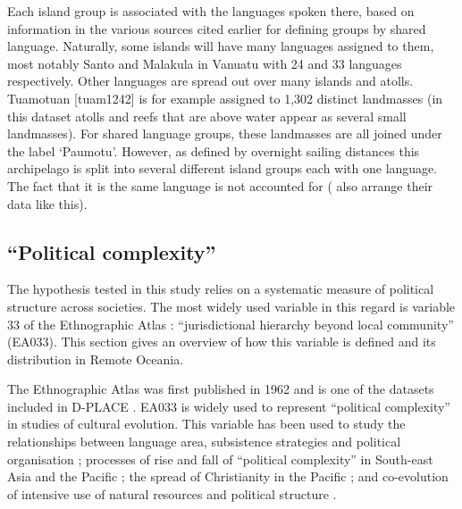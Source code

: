 \documentclass[unnumsec,webpdf,modern,medium]{oup-authoring-template}
\begin{document}
\begin{appendices}

Each island group is associated with the languages spoken there, based on information in the various sources cited earlier for defining groups by shared language. Naturally, some islands will have many languages assigned to them, most notably Santo and Malakula in Vanuatu with 24 and 33 languages respectively. Other languages are spread out over many islands and atolls. Tuamotuan [tuam1242] is for example assigned to 1,302 distinct landmasses (in this dataset atolls and reefs that are above water appear as several small landmasses). For shared language groups, these landmasses are all joined under the label `Paumotu'. However, as defined by overnight sailing distances this archipelago is split into several different island groups each with one language. The fact that it is the same language is not accounted for (\citet{gavin2012island} also arrange their data like this).

\FloatBarrier
\subsection{``Political complexity''}
\label{appendix_def_pol_complex}
The hypothesis tested in this study relies on a systematic measure of political structure across societies. The most widely used variable in this regard is variable 33 of the Ethnographic Atlas \citep{EA_1971}: ``jurisdictional hierarchy beyond local community'' (EA033). This section gives an overview of how this variable is defined and its distribution in Remote Oceania. 

The Ethnographic Atlas was first published in 1962 and is one of the datasets included in D-PLACE \citep{d_place_all}. EA033 is widely used to represent ``political complexity'' in studies of cultural evolution. This variable has been used to study the relationships between language area, subsistence strategies and political organisation \citep{curriemace2009}; processes of rise and fall of ``political complexity'' in South-east Asia and the Pacific \citep{currie2010rise}; the spread of Christianity in the Pacific \citep{watts_2018}; and co-evolution of intensive use of natural resources and political structure \citep{sheehan2018coevolution}.  


\end{appendices}
\end{document}

